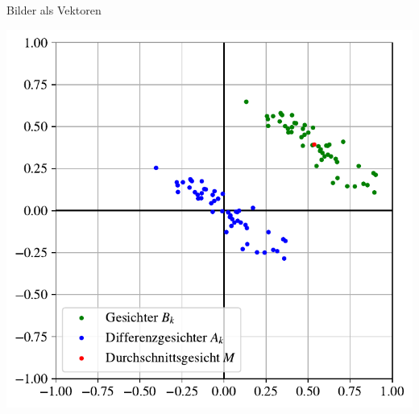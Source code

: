 \documentclass[10pt,aspectratio=169]{beamer}
\begin{document}
\begin{frame}[fragile]{Bilder als Vektoren}
	\begin{minipage}{0.45\textwidth}
		\includegraphics[width=\textwidth]{images/facespace/meandiff}
	\end{minipage}
\end{frame}
\end{document}
